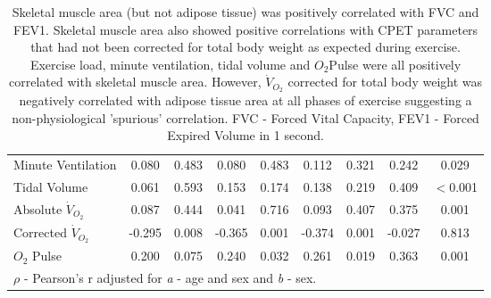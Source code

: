 \begin{table}[p]
\begin{tabular}{|l| c c | c c | c c | c c|}
		Minute Ventilation        & 0.080  & 0.483                     & 0.080  & 0.483                     & 0.112  & 0.321                     & 0.242  & 0.029                       \\
		Tidal Volume              & 0.061  & 0.593                     & 0.153  & 0.174                     & 0.138  & 0.219                     & 0.409  & $<$0.001                    \\
		Absolute $\dot{V}_{O_2}$  & 0.087  & 0.444                     & 0.041  & 0.716                     & 0.093  & 0.407                     & 0.375  & 0.001                       \\
		Corrected $\dot{V}_{O_2}$ & -0.295 & 0.008                     & -0.365 & 0.001                     & -0.374 & 0.001                     & -0.027 & 0.813                       \\
		$O_2$ Pulse               & 0.200  & 0.075                     & 0.240  & 0.032                     & 0.261  & 0.019                     & 0.363  & 0.001                       \\ \hline
		\multicolumn{9}{l}{$\rho$ - Pearson's r adjusted for \textit{a} - age and sex and \textit{b} - sex.}
	\end{tabular}
	\medskip
	\caption*{Skeletal muscle area (but not adipose tissue) was positively correlated with FVC and FEV1. Skeletal muscle area also showed positive correlations with CPET parameters that had not been corrected for total body weight as expected during exercise. Exercise load, minute ventilation, tidal volume and ${O_2}$Pulse were all positively correlated with skeletal muscle area. However, $\dot{V}_{O_2}$ corrected for total body weight was negatively correlated with adipose tissue area at all phases of exercise suggesting a non-physiological 'spurious' correlation. FVC - Forced Vital Capacity, FEV1 - Forced Expired Volume in 1 second.}
\end{table}
